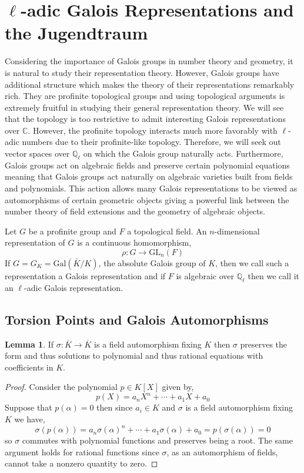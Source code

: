 \documentclass{article}
\newcommand{\Gal}[1]{\mathrm{Gal}\left( #1 \right)}
\newcommand{\GL}[2]{\mathrm{GL}_{#1}\left(#2\right)}
\newcommand{\Q}{\mathbb{Q}}
\newcommand{\C}{\mathbb{C}}
\theoremstyle{definition}
\newtheorem{lemma}[theorem]{Lemma}
\newenvironment{definition}[1][Definition:]{\begin{trivlist}
\item[\hskip \labelsep {\bfseries #1}]}{\end{trivlist}}
\begin{document}
\section{$\ell$-adic Galois Representations and the Jugendtraum}


Considering the importance of Galois groups in number theory and geometry, it is natural to study their representation theory. However, Galois groups have additional structure which makes the theory of their representations remarkably rich. They are profinite topological groups and using topological arguments is extremely fruitful in studying their general representation theory. We will see that the topology is too restrictive to admit interesting Galois representations over $\C$. However, the profinite topology interacts much more favorably with $\ell$-adic numbers due to their profinite-like topology. Therefore, we will seek out vector spaces over $\Q_{\ell}$ on which the Galois group naturally acts. Furthermore, Galois groups act on algebraic fields and preserve certain polynomial equations meaning that Galois groups act naturally on algebraic varieties built from fields and polynomials. This action allows many Galois representations to be viewed as automorphisms of certain geometric objects giving a powerful link between the number theory of field extensions and the geometry of algebraic objects.  

\begin{definition}
Let $G$ be a profinite group and $F$ a topological field. An $n$-dimensional representation of $G$ is a continuous homomorphism,
\[ \rho : G \to \GL{n}{F} \] 
If $G = G_K = \Gal{\bar{K} / K}$, the absolute Galois group of $K$, then we call such a representation a Galois representation and if $F$ is algebraic over $\Q_{\ell}$ then we call it an $\ell$-adic Galois representation.  
\end{definition}

\subsection{Torsion Points and Galois Automorphisms}

\begin{lemma}
If $\sigma : \overline{K} \to \overline{K}$ is a field automorphism fixing $K$ then $\sigma$ preserves the form and thus solutions to polynomial and thus rational equations with coefficients in $K$. 
\end{lemma}

\begin{proof}
Consider the polynomial $p \in K[X]$ given by,
\[ p(X) = a_n X^n + \cdots + a_1 X + a_0 \]
Suppose that $p(\alpha) = 0$ then since $a_i \in K$ and $\sigma$ is a field automorphism fixing $K$ we have,
\[ \sigma(p(\alpha)) = a_n \sigma(\alpha)^n + \cdots + a_1 \sigma(\alpha) + a_0 = p(\sigma(\alpha)) = 0 \]
so $\sigma$ commutes with polynomial functions and preserves being a root. The same argument holds for rational functions since $\sigma$, as an automorphism of fields, cannot take a nonzero quantity to zero.
\end{proof}
\end{document}
